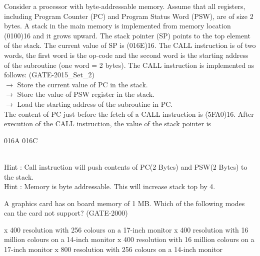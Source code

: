 \begin{questyle}
  \question  Consider a processor with byte-addressable memory. Assume that all registers,
             including Program Counter (PC) and Program Status Word (PSW), are of size 2 bytes. A
             stack in the main memory is implemented from memory location (0100)16 and it grows
             upward. The stack pointer (SP) points to the top element of the stack. The current
             value of SP is (016E)16. The CALL instruction is of two words, the first word is
             the op-code and the second word is the starting address of the subroutine
             (one word = 2 bytes). The CALL instruction is implemented as follows: (GATE-2015\_Set\_2)
             \\ \(\rightarrow\) Store the current value of PC in the stack.
             \\ \(\rightarrow\) Store the value of PSW register in the stack.
             \\ \(\rightarrow\) Load the starting address of the subroutine in PC. \\
             The content of PC just before the fetch of a CALL instruction is (5FA0)16. After
             execution of the CALL instruction, the value of the stack pointer is

  \begin{oneparchoices}
    \choice         016A
    \choice         016C
  \end{oneparchoices}
  \\ Hint : Call instruction will push contents of PC(2 Bytes) and PSW(2 Bytes) to the stack.
  \\ Hint : Memory is byte addressable. This will increase stack top by 4.

  \begin{questyle}
  \question  A graphics card has on board memory of 1 MB. Which of the following modes can
  the card not support? (GATE-2000)

  \begin{choices}
     x 400 resolution with 256 colours on a 17-inch monitor
     x 400 resolution with 16 million colours on a 14-inch monitor
     x 400 resolution with 16 million colours on a 17-inch monitor
     x 800 resolution with 256 colours on a 14-inch monitor
  \end{choices}
\end{questyle}


\end{questyle}

